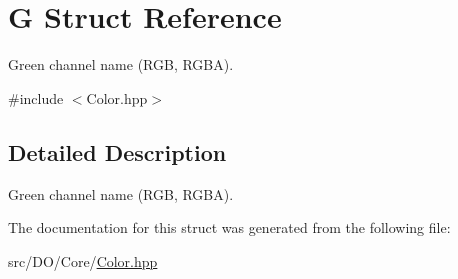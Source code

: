 \hypertarget{struct_d_o_1_1_g}{\section{G Struct Reference}
\label{struct_d_o_1_1_g}
}


Green channel name (R\-G\-B, R\-G\-B\-A).  




{\ttfamily \#include $<$Color.\-hpp$>$}



\subsection{Detailed Description}
Green channel name (R\-G\-B, R\-G\-B\-A). 

The documentation for this struct was generated from the following file\-:\begin{DoxyCompactItemize}
\item 
src/\-D\-O/\-Core/\hyperlink{_color_8hpp}{Color.\-hpp}\end{DoxyCompactItemize}

